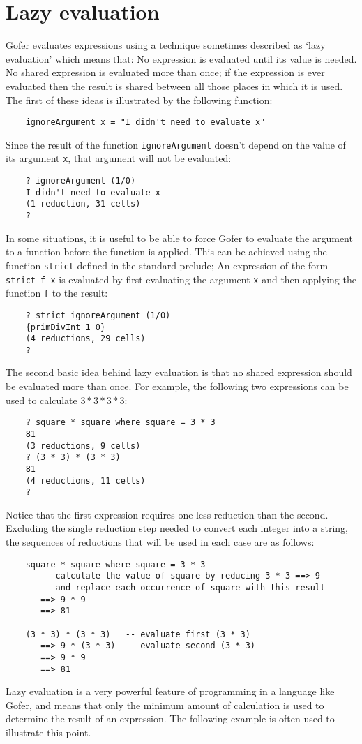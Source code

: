 \section{Lazy evaluation}
Gofer evaluates expressions using a technique  sometimes  described  as
`lazy evaluation' which means that:
\BSI
\IT  No expression is evaluated until its value is needed.
\IT  No  shared  expression  is  evaluated  more  than  once;  if   the
     expression is ever evaluated then the result is shared between all
     those places in which it is used.
\ESI
The first of these ideas is illustrated by the following function:
\begin{verbatim}
    ignoreArgument x = "I didn't need to evaluate x"
\end{verbatim}
Since the result of the function \verb"ignoreArgument" doesn't depend on the
value of its argument \verb"x", that argument will not be evaluated:
\begin{verbatim}
    ? ignoreArgument (1/0)
    I didn't need to evaluate x
    (1 reduction, 31 cells)
    ?
\end{verbatim}
In some situations, it is useful to be able to force Gofer to  evaluate
the argument to a function before the function is applied.  This can be
achieved using the function \verb"strict" defined in the  standard  prelude;
An expression of the form \verb"strict f x" is evaluated by first evaluating
the argument \verb"x" and then applying the function \verb"f" to the result:
\begin{verbatim}
    ? strict ignoreArgument (1/0)
    {primDivInt 1 0}
    (4 reductions, 29 cells)
    ?
\end{verbatim}
The second  basic  idea  behind  lazy  evaluation  is  that  no  shared
expression should be  evaluated  more  than  once.   For  example,  the
following two expressions can be used to calculate $3*3*3*3$:
\begin{verbatim}
    ? square * square where square = 3 * 3
    81
    (3 reductions, 9 cells)
    ? (3 * 3) * (3 * 3)
    81
    (4 reductions, 11 cells)
    ?
\end{verbatim}
Notice that the first expression requires one less reduction  than  the
second.  Excluding the single reduction step  needed  to  convert  each
integer into a string, the sequences of reductions that will be used in
each case are as follows:
\begin{verbatim}
    square * square where square = 3 * 3
       -- calculate the value of square by reducing 3 * 3 ==> 9
       -- and replace each occurrence of square with this result
       ==> 9 * 9
       ==> 81

    (3 * 3) * (3 * 3)   -- evaluate first (3 * 3)
       ==> 9 * (3 * 3)  -- evaluate second (3 * 3)
       ==> 9 * 9
       ==> 81
\end{verbatim}
Lazy evaluation is a very powerful feature of programming in a language
like Gofer, and means that only the minimum amount  of  calculation  is
used to determine the result of an expression.  The  following  example
is often used to illustrate this point.

